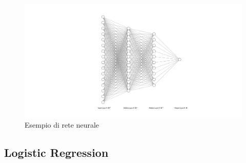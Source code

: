 \begin{figure}[H]
\includegraphics[scale=0.5,center]{img/nnExample.png}
\caption{Esempio di rete neurale}
\end{figure}

\subsection{Logistic Regression}